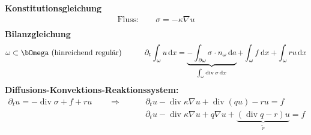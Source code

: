 \documentclass[12pt,twoside,reqno]{article}
\newcommand{\dx}{\,\mathrm{d}x}
\newcommand{\da}{\,\mathrm{d}a}
\renewcommand\div{\operatorname{div}}
\renewcommand{\Omega}{\bOmega}
\newcommand{\rs}{\tilde{r}}
\theoremstyle{TheoWieners}
\theoremstyle{break}
\theoremstyle{app}
\newtheorem{Spezielle Lösungen}[app]{Spezielle Lösungen}
\newtheorem{Spezielle Lösungen der Poisson-Gleichung}[app]{Spezielle Lösungen der Poisson-Gleichung}
\newtheorem{Kartesische Gitter in 2-d}[app]{Kartesische Gitter in 2-d}
\newtheorem{Diskretisierungen hoher Ordnung}[app]{Diskretisierungen hoher Ordnung}
\newtheorem{Zyklische Reduktion}[app]{Zyklische Reduktion}
\begin{document}
\textbf{Konstitutionsgleichung}\\
    \begin{align*}
        \text{Fluss:}\qquad \sigma =-\kappa \nabla u \\
    \end{align*}
\textbf{Bilanzgleichung}
 \begin{align*}
        &\omega \subset \Omega \text{ (hinreichend regulär)}    \qquad &&\partial_t \int_\omega u \dx =  \underbrace{ -\int_{\partial \omega} \sigma \cdot n_\omega \da}
	    _{\int_\omega \div \sigma \dx} +\int_\omega f \dx + \int_\omega ru \dx  \\
    \end{align*}
        \textbf{Diffusions-Konvektions-Reaktionssystem:}
        \begin{align*} %
\partial_t u= -\div \sigma + f +ru \qquad \Longrightarrow \qquad &\partial_t u -\div \kappa \nabla u + \div(qu)-ru = f \\ &\partial_t u -\div \kappa \nabla u + q\nabla u + \underbrace{(\div q- r)u}_{\rs} = f        \end{align*}
      
\end{document}
